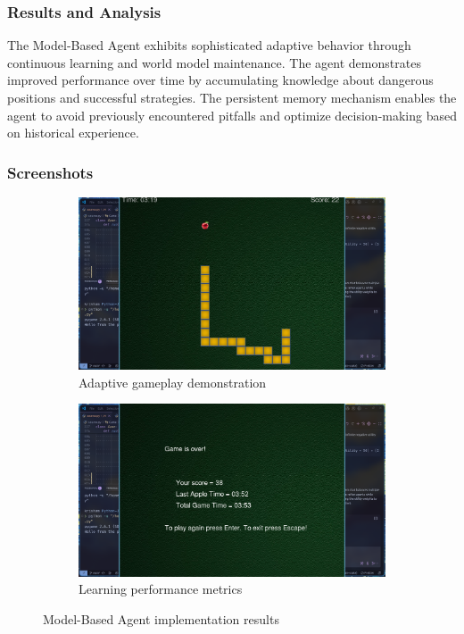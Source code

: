 \documentclass[11pt,a4paper]{article}
\begin{document}
\subsubsection{Results and Analysis}
The Model-Based Agent exhibits sophisticated adaptive behavior through continuous learning and world model maintenance. The agent demonstrates improved performance over time by accumulating knowledge about dangerous positions and successful strategies. The persistent memory mechanism enables the agent to avoid previously encountered pitfalls and optimize decision-making based on historical experience.

\subsubsection{Screenshots}
\begin{figure}[H]
    \centering
    \begin{subfigure}{0.45\textwidth}
        \includegraphics[width=\textwidth]{ss/model_based_play.png}
        \caption{Adaptive gameplay demonstration}
    \end{subfigure}
    \hfill
    \begin{subfigure}{0.45\textwidth}
        \includegraphics[width=\textwidth]{ss/model_based_score.png}
        \caption{Learning performance metrics}
    \end{subfigure}
    \caption{Model-Based Agent implementation results}
\end{figure}
\end{document}
